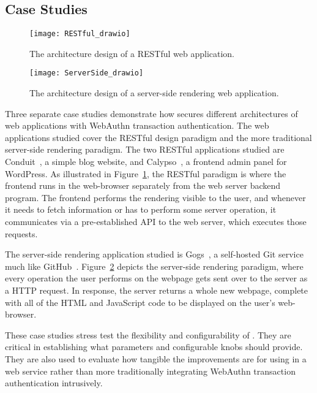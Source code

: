 \subsection{Case Studies}

\begin{figure}[h]
  \centering
  \texttt{[image: RESTful\_drawio]}
  \caption{The architecture design of a RESTful web application.}
  \label{Fig:CaseStudiesRESTful}
\end{figure}

\begin{figure}[h]
  \centering
  \texttt{[image: ServerSide\_drawio]}
  \caption{The architecture design of a server-side rendering web application.}
  \label{Fig:CaseStudiesServerSide}
\end{figure}

Three separate case studies demonstrate how \sys{} secures different architectures of web applications with WebAuthn transaction authentication. The web applications studied cover the RESTful design paradigm and the more traditional server-side rendering paradigm. The two RESTful applications studied are Conduit~\cite{conduit}, a simple blog website, and Calypso~\cite{calypso}, a frontend admin panel for WordPress. As illustrated in Figure~\ref{Fig:CaseStudiesRESTful}, the RESTful paradigm is where the frontend runs in the web-browser separately from the web server backend program. The frontend performs the rendering visible to the user, and whenever it needs to fetch information or has to perform some server operation, it communicates via a pre-established API to the web server, which executes those requests. 

The server-side rendering application studied is Gogs~\cite{gogs}, a self-hosted Git service much like GitHub~\cite{github}. Figure~\ref{Fig:CaseStudiesServerSide} depicts the server-side rendering paradigm, where every operation the user performs on the webpage gets sent over to the server as a HTTP request. In response, the server returns a whole new webpage, complete with all of the HTML and JavaScript code to be displayed on the user's web-browser.


These case studies stress test the flexibility and configurability of \sys{}. They are critical in establishing what parameters and configurable knobs \sys{} should provide. They are also used to evaluate how tangible the improvements are for using \sys{} in a web service rather than more traditionally integrating WebAuthn transaction authentication intrusively. 

